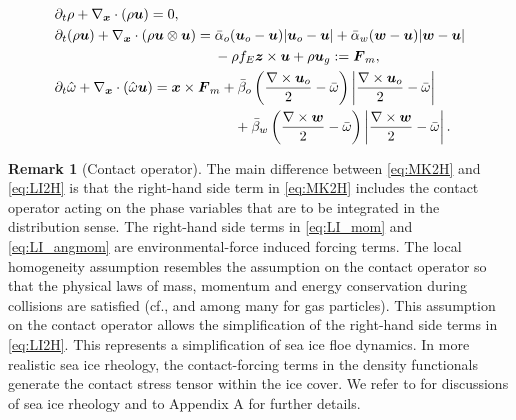 \documentclass[a4paper,11pt]{article}
\numberwithin{equation}{section}
\theoremstyle{definition}
\newtheorem{remark}[theorem]{Remark}
\newcommand{\bfx}{\boldsymbol{x}}
\newcommand{\bfz}{\boldsymbol{z}}
\newcommand{\bfu}{\boldsymbol{u}_o}
\newcommand{\bfuu}{\boldsymbol{u}}
\newcommand{\bfF}{\boldsymbol{F}}
\newcommand{\bfw}{\boldsymbol{w}}
\begin{document}
\begin{subequations}
    \label{eq:LI2H}
\begin{align}
&\partial_t\rho+\nabla_{\bfx}\cdot(\rho\bfuu)=0,\label{eq:LI_mass}\\
&\partial_t(\rho\bfuu)+\nabla_{\bfx}\cdot(\rho\bfuu\otimes\bfuu)= \bar\alpha_o (\bfu-\bfuu)|\bfu-\bfuu| +\bar\alpha_w (\bfw-\bfuu)|\bfw-\bfuu| \nonumber\\
&\hspace{4cm}- \rho f_E \bfz \times \bfuu + \rho \bfuu_g := \bfF_m,\label{eq:LI_mom}\\
&\partial_t\hat\omega+\nabla_{\bfx}\cdot(\hat\omega \bfuu )=  \bfx\times \bfF_m + \bar\beta_o \left(\frac{\nabla\times\bfu}{2}-\bar\omega\right)\left|\frac{\nabla\times\bfu}{2}-\bar\omega\right|\label{eq:LI_angmom} \\
& \hspace{4.5cm} + \bar\beta_w \left(\frac{\nabla\times\bfw}{2}-\bar\omega\right)\left|\frac{\nabla\times\bfw}{2}-\bar\omega\right|. \nonumber
\end{align}
\end{subequations}

\begin{remark}[Contact operator]
    The main difference between \eqref{eq:MK2H} and \eqref{eq:LI2H} is that the right-hand side term in \eqref{eq:MK2H} includes the contact operator acting on the phase variables that are to be integrated in the distribution sense. 
    The right-hand side terms in \eqref{eq:LI_mom} and \eqref{eq:LI_angmom} 
    are environmental-force induced forcing terms. 
    The local homogeneity assumption resembles the assumption on the contact operator so that the physical laws of mass, momentum and energy conservation
    during collisions are satisfied (cf., \cite[Eq. (4)]{bardos1991fluid} and \cite{dufty2001kinetic,cercignani2013mathematical,saint2009hydrodynamic,golse2003mean,golse2005boltzmann,golse2016dynamics} among many for gas particles). 
    This assumption on the contact operator allows the simplification of the right-hand side terms in \eqref{eq:LI2H}.
    This represents a simplification of sea ice floe dynamics. In more realistic sea ice rheology, the contact-forcing terms in the density functionals generate the contact stress tensor within the ice cover. We refer to \cite{shen1987role,feltham2008sea,herman2022granular} for discussions of sea ice rheology and to Appendix A for further details.
\end{remark}
\end{document}

